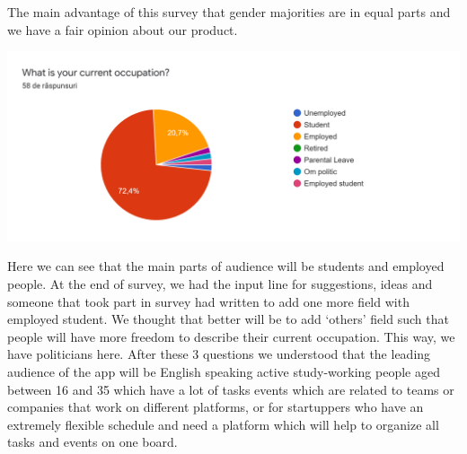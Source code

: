 \par The main advantage of this survey that gender majorities are in equal parts and we have a fair opinion about our product. 
\par
\includegraphics[width=\textwidth]{TargetGroup3}
\par Here we can see that the main parts of audience will be students and employed people. At the end of survey, we had the input line for suggestions, ideas and someone that took part in survey had written to add one more field with employed student. We thought that better will be to add ‘others’ field such that people will have more freedom to describe their current occupation. This way, we have politicians here. 
After these 3 questions we understood that the leading audience of the app will be English speaking active study-working people aged between 16 and 35 which have a lot of tasks events which are related to teams or companies that work on different platforms, or for startuppers who have an extremely flexible schedule and need a platform which will help to organize all tasks and events on one board. 


